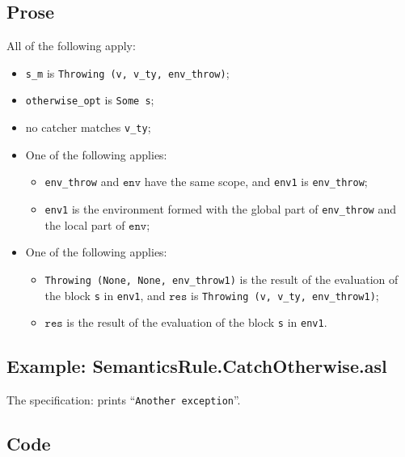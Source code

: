 \documentclass{book}
\newcommand\env[0]{\texttt{env}}
\newcommand\vres[0]{\texttt{res}}
\begin{document}
    \subsection{Prose}
    All of the following apply:
    \begin{itemize}
    \item \texttt{s\_m} is \texttt{Throwing (v, v\_ty, env\_throw)};
    \item \texttt{otherwise\_opt} is \texttt{Some s};
    \item no catcher matches \texttt{v\_ty};
    \item One of the following applies:
      \begin{itemize}
      \item \texttt{env\_throw} and $\env$ have the same scope, and \texttt{env1} is \texttt{env\_throw};
      \item \texttt{env1} is the environment formed with the global part of \texttt{env\_throw}
        and the local part of $\env$;
      \end{itemize}
    \item One of the following applies:
      \begin{itemize}
      \item \texttt{Throwing (None, None, env\_throw1)} is the result of the evaluation of
        the block \texttt{s} in \texttt{env1}, and $\vres$ is \texttt{Throwing (v, v\_ty, env\_throw1)};
      \item $\vres$ is the result of the evaluation of the block \texttt{s} in \texttt{env1}.
      \end{itemize}
    \end{itemize}

    \subsection{Example: SemanticsRule.CatchOtherwise.asl}
     The specification:
     prints ``\texttt{Another exception}''.

  \subsection{Code}
\end{document}
